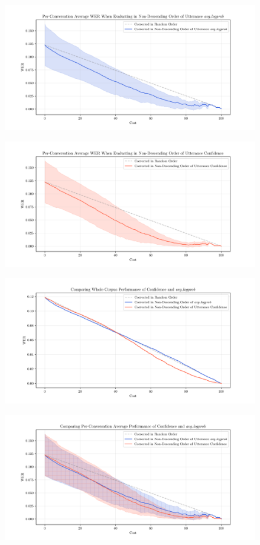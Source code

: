 \begin{figure}[h]
 \includegraphics[width=\textwidth]{figures/average-avg-logprob.png}
 \centering
\end{figure}
\begin{figure}[h]
 \includegraphics[width=\textwidth]{figures/average-uttconf.png}
 \centering
\end{figure}
\begin{figure}[h]
 \includegraphics[width=\textwidth]{figures/corpus-avg-lprob-uttconf.png}
 \centering
\end{figure}
\begin{figure}[h]
 \includegraphics[width=\textwidth]{figures/compare-avg-uttconf-vs-lprob.png}
 \centering
\end{figure}
